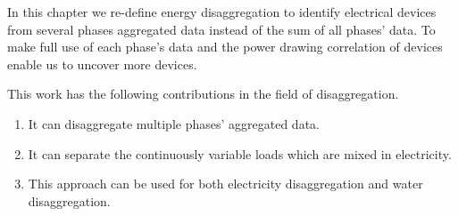 
In this chapter we re-define energy disaggregation to identify electrical devices from 
several phases aggregated data instead of the sum of all phases' data. 
To make full use of each phase's data and the power drawing correlation of devices 
enable us to uncover more devices.

This work has the following contributions in the field of disaggregation.
\begin{enumerate}
\item It can disaggregate multiple phases' aggregated data.
\item It can separate the continuously variable loads which are mixed in electricity. 
\item This approach can be used for both electricity disaggregation and water disaggregation.
\end{enumerate}


